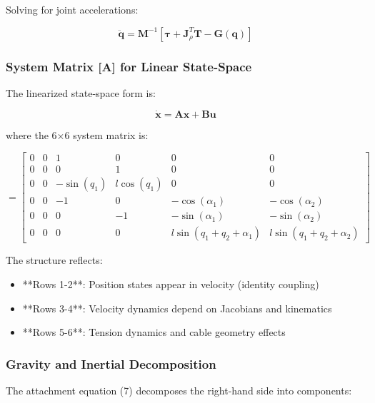 Solving for joint accelerations:

\begin{equation}
\ddot{\mathbf{q}} = \mathbf{M}^{-1} \left[ \boldsymbol{\tau} + \mathbf{J}_{\rho}^T \mathbf{T} - \mathbf{G}(\mathbf{q}) \right]
\end{equation}

\subsubsection{System Matrix [A] for Linear State-Space}

The linearized state-space form is:

\begin{equation}
\dot{\mathbf{x}} = \mathbf{A} \mathbf{x} + \mathbf{B} \mathbf{u}
\end{equation}

where the 6×6 system matrix is:

\begin{equation}
[\mathbf{A}] = \begin{bmatrix}
0 & 0 & 1 & 0 & 0 & 0 \\
0 & 0 & 0 & 1 & 0 & 0 \\
0 & 0 & -\sin(q_1) & l \cos(q_1) & 0 & 0 \\
0 & 0 & -1 & 0 & -\cos(\alpha_1) & -\cos(\alpha_2) \\
0 & 0 & 0 & -1 & -\sin(\alpha_1) & -\sin(\alpha_2) \\
0 & 0 & 0 & 0 & l \sin(q_1 + q_2 + \alpha_1) & l \sin(q_1 + q_2 + \alpha_2)
\end{bmatrix}
\end{equation}

The structure reflects:
\begin{itemize}
    \item **Rows 1-2**: Position states appear in velocity (identity coupling)
    \item **Rows 3-4**: Velocity dynamics depend on Jacobians and kinematics
    \item **Rows 5-6**: Tension dynamics and cable geometry effects
\end{itemize}

\subsubsection{Gravity and Inertial Decomposition}

The attachment equation (7) decomposes the right-hand side into components:


